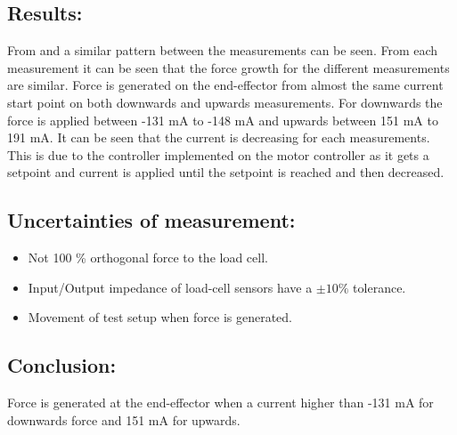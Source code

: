 \subsection*{Results:}
From  and  a similar pattern between the measurements can be seen. From each measurement it can be seen that the force growth for the different measurements are similar. Force is generated on the end-effector from almost the same current start point on both downwards and upwards measurements. For downwards the force is applied between -131 mA to -148 mA and upwards between 151 mA to 191 mA. It can be seen that the current is decreasing for each measurements. This is due to the controller implemented on the motor controller as it gets a setpoint and current is applied until the setpoint is reached and then decreased.


%
\subsection*{Uncertainties of measurement:}
\begin{itemize}
\item Not 100 \% orthogonal force to the load cell.
\item Input/Output impedance of load-cell sensors have a $\pm 10 \%$ tolerance.
\item Movement of test setup when force is generated.
\end{itemize}

\subsection*{Conclusion:}
Force is generated at the end-effector when a current higher than -131 mA for downwards force and 151 mA for upwards.